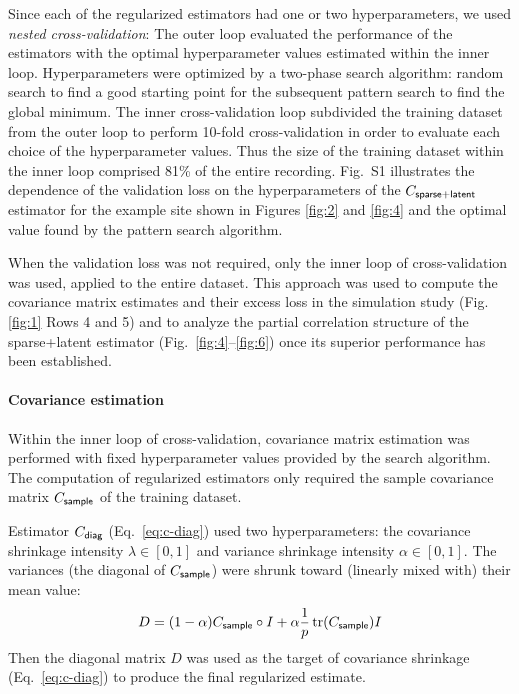 \documentclass[10pt]{article}
\DeclareMathOperator{\Tr}{tr}
\newcommand{\figref}[2]{Fig.\;\ref{fig:#1}\,#2}
\begin{document}
Since each of the regularized estimators had one or two hyperparameters, we used \emph{nested cross-validation}:  The outer loop evaluated the performance of the estimators with the optimal hyperparameter values estimated within the inner loop.  Hyperparameters were optimized by a two-phase search algorithm: random search to find a good starting point for the subsequent pattern search to find the global minimum.  The inner cross-validation loop subdivided the training dataset from the outer loop to perform 10-fold cross-validation in order to evaluate each choice of the hyperparameter values.  Thus the size of the training dataset within the inner loop comprised 81\% of the entire recording. Fig.~S1 illustrates the dependence of the validation loss on the hyperparameters of the $C_{\sf sparse+latent}$ estimator for the example site shown in Figures \ref{fig:2} and \ref{fig:4} and the optimal value found by the pattern search algorithm.

When the validation loss was not required, only the inner loop of cross-validation was used, applied to the entire dataset.  This approach was used to compute the covariance matrix estimates and their excess loss in the simulation study (\figref{1}{\,Rows 4 and 5}) and to analyze the partial correlation structure of the sparse+latent estimator (Fig.~\ref{fig:4}--\ref{fig:6}) once its superior performance has been established.

\paragraph{Covariance estimation}
Within the inner loop of cross-validation, covariance matrix estimation was performed with fixed hyperparameter values provided by the search algorithm.  The computation of regularized estimators only required the sample covariance matrix $C_{\sf sample}$ of the training dataset. 

Estimator $C_{\sf diag}$ (Eq.~\ref{eq:c-diag})  used two hyperparameters: the covariance shrinkage intensity $\lambda \in [0,1]$ and variance shrinkage intensity $\alpha \in [0,1]$.  The variances (the diagonal of $C_{\sf sample}$) were shrunk toward (linearly mixed with) their mean value:
\begin{equation}
D = (1-\alpha)C_{\sf sample}\circ I + \alpha \frac 1 p \Tr(C_{\sf sample}) I
\end{equation}
Then the diagonal matrix $D$ was used as the target of covariance shrinkage (Eq.~\ref{eq:c-diag}) to produce the final regularized estimate.
\end{document}
